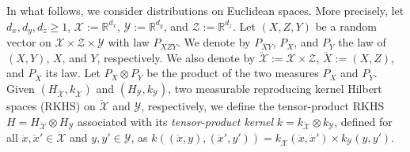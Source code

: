 In what follows, we consider distributions on Euclidean spaces. More precisely, let $d_x,d_y,d_z\geq 1$, $\mathcal{X}:=\mathbb{R}^{d_x}$, $\mathcal{Y}:=\mathbb{R}^{d_y}$, and $\mathcal{Z}:=\mathbb{R}^{d_z}$. Let $(X,Z,Y)$ be a random vector on $\mathcal{X}\times\mathcal{Z}\times\mathcal{Y}$ with law $P_{XZY}$. We denote by $P_{XY}$, $P_X$, and $P_Y$ the law of $(X,Y)$, $X$, and $Y$, respectively. We also denote by $\mathcal{\ddot{X}}:=\mathcal{X}\times\mathcal{Z}$, $\ddot{X}:=(X,Z)$, and $P_{\ddot{X}}$ its law. Let $P_X\otimes P_Y$ be the product of the two measures $P_X$ and $P_Y$. Given $(H_{\mathcal{\ddot{X}}},k_\mathcal{\ddot{X}})$ and $(H_{\mathcal{Y}},k_{\mathcal{Y}})$, two measurable reproducing kernel Hilbert spaces (RKHS) on $\mathcal{\ddot{X}}$ and $\mathcal{Y}$, respectively, we define the tensor-product RKHS $H=H_{\mathcal{\ddot{X}}}\otimes H_\mathcal{Y}$ associated with its \emph{tensor-product kernel} $k=k_{\mathcal{\ddot{X}}}\otimes k_{\mathcal{Y}}$, defined for all $\ddot{x},\ddot{x}'\in\mathcal{\ddot{X}}$ and $y,y'\in\mathcal{Y}$, as $k((\ddot{x},y),(\ddot{x}',y'))= k_{\mathcal{\ddot{X}}}(\ddot{x},\ddot{x}')\times k_{\mathcal{Y}}(y,y').$

















